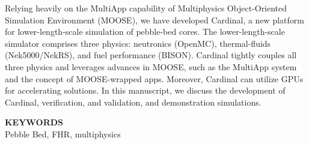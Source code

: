 \documentclass[11pt,letterpaper,english]{article}
\begin{document}
Relying heavily on the MultiApp capability of Multiphysics Object-Oriented Simulation Environment (MOOSE),
we have developed Cardinal, a new platform for lower-length-scale simulation of pebble-bed cores. The lower-length-scale simulator comprises three physics: neutronics (OpenMC), thermal-fluids (Nek5000/NekRS), and fuel performance (BISON).   Cardinal tightly couples all three physics and leverages advances in MOOSE, such as the MultiApp system and the concept of MOOSE-wrapped apps. Moreover, Cardinal can utilize GPUs for accelerating solutions. In this manuscript, we discuss the development of Cardinal, verification, and validation, and demonstration simulations.

\begin{flushright}
{\bf KEYWORDS} \\
Pebble Bed, FHR, multiphysics
\end{flushright}

\doublespacing








%

%
%
%

%

\begin{center}
\scriptsize
{}
\normalsize
\end{center}
\end{document}
